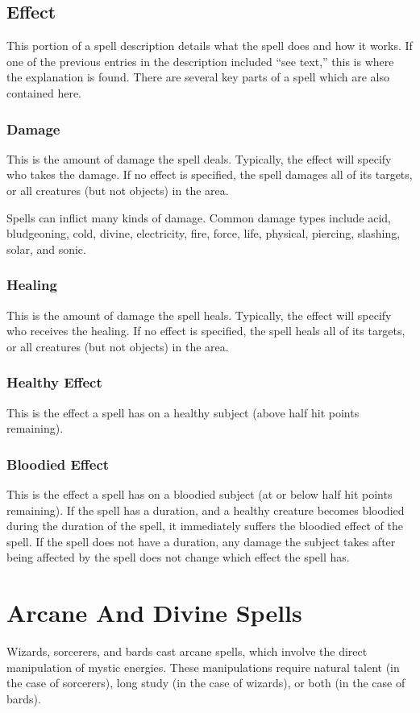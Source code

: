 \subsection{Effect}
This portion of a spell description details what the spell does and how it works. If one of the previous entries in the description included ``see text,'' this is where the explanation is found. There are several key parts of a spell which are also contained here.

\subsubsection{Damage}
This is the amount of damage the spell deals. Typically, the effect will specify who takes the damage. If no effect is specified, the spell damages all of its targets, or all creatures (but not objects) in the area.

Spells can inflict many kinds of damage. Common damage types include acid, bludgeoning, cold, divine, electricity, fire, force, life, physical, piercing, slashing, solar, and sonic.

\subsubsection{Healing}
This is the amount of damage the spell heals. Typically, the effect will specify who receives the healing. If no effect is specified, the spell heals all of its targets, or all creatures (but not objects) in the area.

\subsubsection{Healthy Effect}
This is the effect a spell has on a healthy subject (above half hit points remaining).

\subsubsection{Bloodied Effect}
This is the effect a spell has on a bloodied subject (at or below half hit points remaining). If the spell has a duration, and a healthy creature becomes bloodied during the duration of the spell, it immediately suffers the bloodied effect of the spell. If the spell does not have a duration, any damage the subject takes after being affected by the spell does not change which effect the spell has.

\section{Arcane And Divine Spells}
Wizards, sorcerers, and bards cast arcane spells, which involve the direct manipulation of mystic energies. These manipulations require natural talent (in the case of sorcerers), long study (in the case of wizards), or both (in the case of bards).

